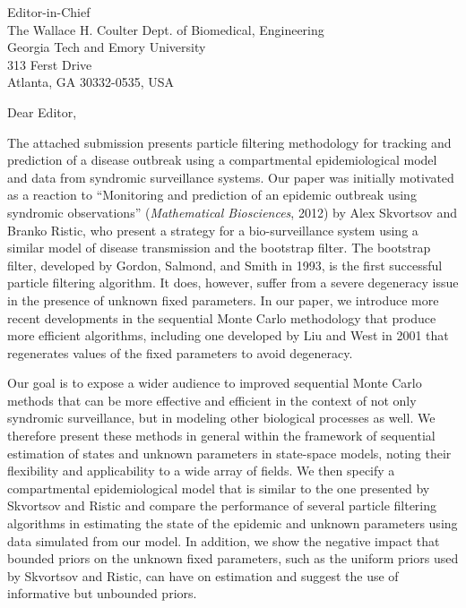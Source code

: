 \documentclass{letter} %
\begin{document}
\signature{Daniel M. Sheinson, Jarad Niemi, and Wendy Meiring}           %
\longindentation=0pt                       %
\let\raggedleft\raggedright                %

\begin{letter}{Editor-in-Chief \\
The Wallace H. Coulter Dept. of Biomedical, Engineering \\
Georgia Tech and Emory University \\
313 Ferst Drive \\
Atlanta, GA 30332-0535, USA
}

\opening{Dear Editor,}

\noindent The attached submission presents particle filtering methodology for tracking and prediction of a disease outbreak using a compartmental epidemiological model and data from syndromic surveillance systems. Our paper was initially motivated as a reaction to ``Monitoring and prediction of an epidemic outbreak using syndromic observations'' (\emph{Mathematical Biosciences}, 2012) by Alex Skvortsov and Branko Ristic, who present a strategy for a bio-surveillance system using a similar model of disease transmission and the bootstrap filter. The bootstrap filter, developed by Gordon, Salmond, and Smith in 1993, is the first successful particle filtering algorithm. It does, however, suffer from a severe degeneracy issue in the presence of unknown fixed parameters. In our paper, we introduce more recent developments in the sequential Monte Carlo methodology that produce more efficient algorithms, including one developed by Liu and West in 2001 that regenerates values of the fixed parameters to avoid degeneracy.

Our goal is to expose a wider audience to improved sequential Monte Carlo methods that can be more effective and efficient in the context of not only syndromic surveillance, but in modeling other biological processes as well. We therefore present these methods in general within the framework of sequential estimation of states and unknown parameters in state-space models, noting their flexibility and applicability to a wide array of fields. We then specify a compartmental epidemiological model that is similar to the one presented by Skvortsov and Ristic and compare the performance of several particle filtering algorithms in estimating the state of the epidemic and unknown parameters using data simulated from our model. In addition, we show the negative impact that bounded priors on the unknown fixed parameters, such as the uniform priors used by Skvortsov and Ristic, can have on estimation and suggest the use of informative but unbounded priors.


\end{letter}
\end{document}
